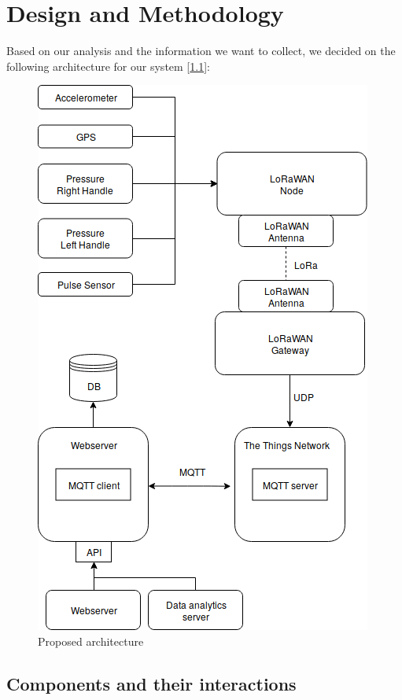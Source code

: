 \chapter{Design and Methodology}
\label{cha:design-and-method}

Based on our analysis and the information we want to collect, we decided on the following architecture for our system [\ref{fig:architecture1}]:

\begin{figure}[h!]
	\centering
	\includegraphics[width=0.9\linewidth]{gfx/architecture_design_and_methology_h}
	\caption{Proposed architecture}
	\label{fig:architecture1}
\end{figure}

\section{Components and their interactions}


